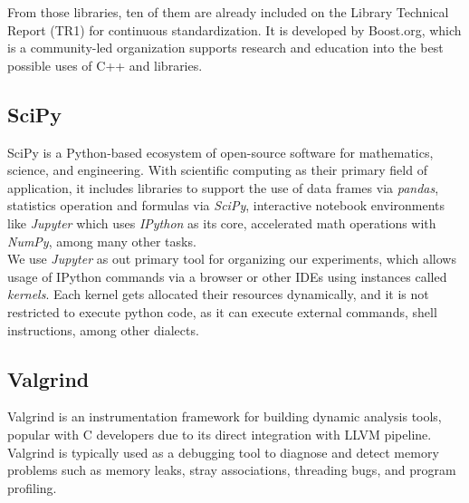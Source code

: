 From those libraries, ten of them are already included on the Library Technical Report (TR1) for continuous standardization. It is developed by Boost.org, which is a community-led organization supports research and education into the best possible uses of C++ and libraries.\\

\subsection{SciPy}

SciPy is a Python-based ecosystem of open-source software for mathematics, science, and engineering. With scientific computing as their primary field of application, it includes libraries to support the use of data frames via \textit{pandas}, statistics operation and formulas via \textit{SciPy}, interactive notebook environments like \textit{Jupyter} which uses \textit{IPython} as its core, accelerated math operations with \textit{NumPy}, among many other tasks. \\

We use \textit{Jupyter} as out primary tool for organizing our experiments, which allows usage of IPython commands via a browser or other IDEs using instances called \textit{kernels}. Each kernel gets allocated their resources dynamically, and it is not restricted to execute python code, as it can execute external commands, shell instructions, among other dialects. \\

\subsection{Valgrind}

Valgrind is an instrumentation framework for building dynamic analysis tools, popular with C developers due to its direct integration with LLVM pipeline. Valgrind is typically used as a debugging tool to diagnose and detect memory problems such as memory leaks, stray associations, threading bugs, and program profiling.\\
